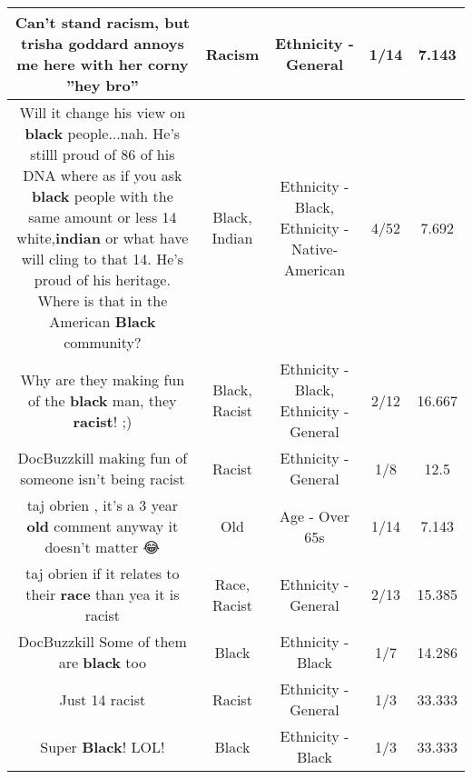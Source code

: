 \documentclass[11pt]{article}
\newlength\mylength
\begin{document}
\begin{center}
\begin{longtable}{|C{.65\mylength}|C{.30\mylength}|C{.12\mylength}|C{.12\mylength}|C{.12\mylength}|}
  \small Can't stand \textbf{racism}, but trisha goddard annoys me here with her corny ''hey bro''\normalsize   & Racism & Ethnicity - General & 1/14 & 7.143 \\  \hline
  \small Will it change his view on \textbf{black} people...nah. He's stilll proud of 86 of his DNA where as if you ask \textbf{black} people with the same amount or less 14 white,\textbf{indian} or what have will cling to that 14. He's proud of his heritage. Where is that in the American \textbf{Black} community?\normalsize   & Black, Indian & Ethnicity - Black, Ethnicity - Native-American & 4/52 & 7.692 \\  \hline
  \small Why are they making fun of the \textbf{black} man, they \textbf{racist}! ;)\normalsize   & Black, Racist & Ethnicity - Black, Ethnicity - General & 2/12 & 16.667 \\  \hline
  \small DocBuzzkill making fun of someone isn't being racist\normalsize   & Racist & Ethnicity - General & 1/8 & 12.5 \\  \hline
  \small taj obrien , it's a 3 year \textbf{old} comment anyway it doesn't matter 😂\normalsize   & Old & Age - Over 65s & 1/14 & 7.143 \\  \hline
  \small taj obrien if it relates to their \textbf{race} than yea it is racist\normalsize   & Race, Racist & Ethnicity - General & 2/13 & 15.385 \\  \hline
  \small DocBuzzkill Some of them are \textbf{black} too\normalsize   & Black & Ethnicity - Black & 1/7 & 14.286 \\  \hline
  \small Just 14 racist\normalsize   & Racist & Ethnicity - General & 1/3 & 33.333 \\  \hline
  \small Super \textbf{Black}! LOL!\normalsize   & Black & Ethnicity - Black & 1/3 & 33.333 \\  \hline

\end{longtable}
\end{center}
\end{document}
